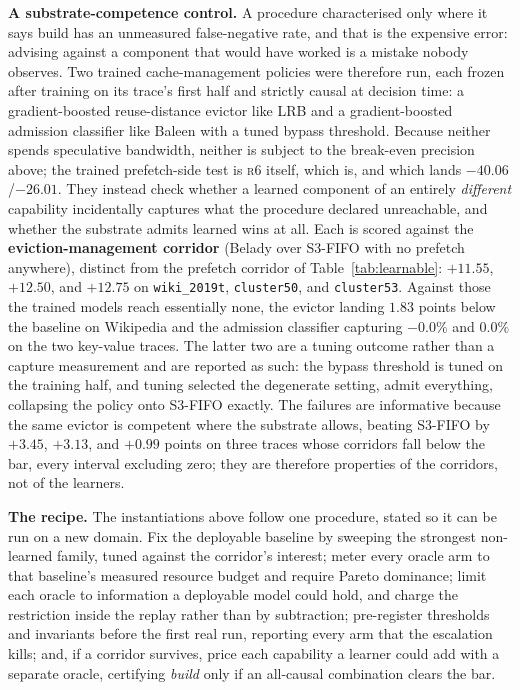 \documentclass[letterpaper]{article} %
\newcommand{\rung}[1]{\textsc{#1}}
\begin{document}
\textbf{A substrate-competence control.} A procedure characterised only where it says build has an unmeasured false-negative rate, and that is the expensive error: advising against a component that would have worked is a mistake nobody observes. Two trained cache-management policies were therefore run, each frozen after training on its trace's first half and strictly causal at decision time: a gradient-boosted reuse-distance evictor like LRB \citep{lrb} and a gradient-boosted admission classifier like Baleen \citep{baleen} with a tuned bypass threshold. Because neither spends speculative bandwidth, neither is subject to the break-even precision above; the trained prefetch-side test is \rung{r6} itself, which is, and which lands $-40.06$/$-26.01$. They instead check whether a learned component of an entirely \emph{different} capability incidentally captures what the procedure declared unreachable, and whether the substrate admits learned wins at all. Each is scored against the \textbf{eviction-management corridor} (Belady over S3-FIFO with no prefetch anywhere), distinct from the prefetch corridor of Table~\ref{tab:learnable}: $+11.55$, $+12.50$, and $+12.75$ on \texttt{wiki\_2019t}, \texttt{cluster50}, and \texttt{cluster53}. Against those the trained models reach essentially none, the evictor landing $1.83$ points below the baseline on Wikipedia and the admission classifier capturing $-0.0\%$ and $0.0\%$ on the two key-value traces. The latter two are a tuning outcome rather than a capture measurement and are reported as such: the bypass threshold is tuned on the training half, and tuning selected the degenerate setting, admit everything, collapsing the policy onto S3-FIFO exactly. The failures are informative because the same evictor is competent where the substrate allows, beating S3-FIFO by $+3.45$, $+3.13$, and $+0.99$ points on three traces whose corridors fall below the bar, every interval excluding zero; they are therefore properties of the corridors, not of the learners.

\textbf{The recipe.} The instantiations above follow one procedure, stated so it can be run on a new domain. Fix the deployable baseline by sweeping the strongest non-learned family, tuned against the corridor's interest; meter every oracle arm to that baseline's measured resource budget and require Pareto dominance; limit each oracle to information a deployable model could hold, and charge the restriction inside the replay rather than by subtraction; pre-register thresholds and invariants before the first real run, reporting every arm that the escalation kills; and, if a corridor survives, price each capability a learner could add with a separate oracle, certifying \emph{build} only if an all-causal combination clears the bar.
\end{document}

